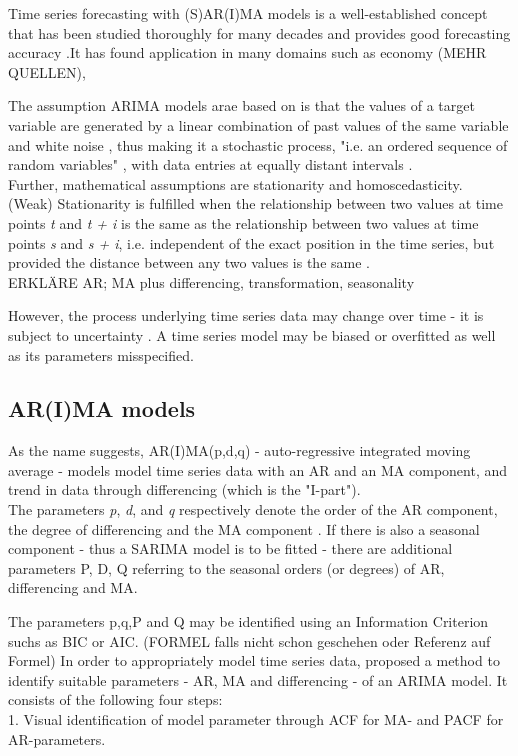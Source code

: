 \documentclass[12pt,titlepage]{article}
\begin{document}
Time series forecasting with (S)AR(I)MA models is a well-established concept that has been studied thoroughly for many decades and provides good forecasting accuracy \citep{Arlt.2017, Khandelwal.2015}.It has found application in many domains such as economy (MEHR QUELLEN), 

The assumption ARIMA models arae based on is that the values of a target variable are generated by a linear combination of past values of the same variable and white noise \citep{Khandelwal.2015}, thus making it a stochastic process, "i.e. an ordered sequence of random variables" \citep{Andreoni.2006}, with data entries at equally distant intervals \citep{Hunt.2003}.\\
Further, mathematical assumptions are stationarity and homoscedasticity.\\
(Weak) Stationarity is fulfilled when the relationship between two values at time points \textit{t} and \textit{t + i} is the same as the relationship between two values at time points \textit{s} and \textit{s + i}, i.e. independent of the exact position in the time series, but provided the distance between any two values is the same \citep{Hunt.2003}.\\

ERKLÄRE AR; MA plus differencing, transformation, seasonality

However, the process underlying time series data may change over time - it is subject to uncertainty \citep{Adhikari.2015}. A time series model may be biased or overfitted as well as its parameters misspecified. \\

\subsection{AR(I)MA models}

As the name suggests, AR(I)MA(p,d,q) - auto-regressive integrated moving average - models model time series data with an AR and an MA component, and trend in data through differencing (which is the "I-part"). \\
The parameters \textit{p}, \textit{d}, and \textit{q} respectively denote the order of the AR component, the degree of differencing and the MA component \citep{Zhao.07022018}.
If there is also a seasonal component - thus a SARIMA model is to be fitted - there are additional parameters P, D, Q referring to the seasonal orders (or degrees) of AR, differencing and MA.


The parameters p,q,P and Q may be identified using an Information Criterion suchs as BIC or AIC. (FORMEL falls nicht schon geschehen oder Referenz auf Formel)
In order to appropriately model time series data, \citep{Box.1976} proposed a method to identify suitable parameters - AR, MA and differencing - of an ARIMA model. It consists of the following four steps: \\
1. Visual identification of model parameter through ACF for MA- and PACF for AR-parameters.





\end{document}
